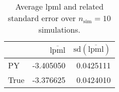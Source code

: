 \begin{table}[H]

\caption{Average lpml and related standard error over $n_{\text{sim}} = 10$ simulations.}
\centering
\begin{tabular}[t]{lrr}
\toprule
  & $\overbar{\text{lpml}}$ & $\text{sd}(\overbar{\text{lpml}})$\\
\midrule
PY & -3.405050 & 0.0425111\\
True & -3.376625 & 0.0424010\\
\bottomrule
\end{tabular}
\end{table}